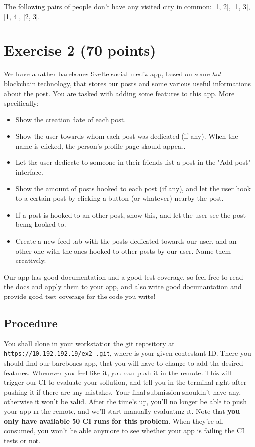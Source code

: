 \documentclass{article}
\begin{document}
The following pairs of people don't have any visited city in common: [1, 2], [1, 3], [1, 4], [2, 3].

\pagebreak
\section*{Exercise 2 (70 points)}
We have a rather barebones Svelte social media app, based on some \textit{hot} blockchain technology, that stores our posts and some various useful informations about the post.
You are tasked with adding some features to this app. More specifically:
\begin{itemize}
	\item Show the creation date of each post.
	\item Show the user towards whom each post was dedicated (if any). When the name is clicked, the person's profile page should appear.
	\item Let the user dedicate to someone in their friends list a post in the "Add post" interface.
	\item Show the amount of posts hooked to each post (if any), and let the user hook to a certain post by clicking a button (or whatever) nearby the post.
	\item If a post is hooked to an other post, show this, and let the user see the post being hooked to.
	\item Create a new feed tab with the posts dedicated towards our user, and an other one with the ones hooked to other posts by our user. Name them creatively.
\end{itemize}

Our app has good documentation and a good test coverage, so feel free to read the docs and apply them to your app, and also write good documantation and provide good test coverage for the code you write!
\subsection*{Procedure}
You shall clone in your workstation the git repository at \verb|https://10.192.192.19/ex2_|\verb|.git|, where  is your given contestant ID.
There you should find our barebones app, that you will have to change to add the desired features.
Whenever you feel like it, you can push it in the remote.
This will trigger our CI to evaluate your sollution, and tell you in the terminal right after pushing it if there are any mistakes.
Your final submission shouldn't have any, otherwise it won't be valid.
After the time's up, you'll no longer be able to push your app in the remote, and we'll start manually evaluating it.
Note that \textbf{you only have available 50 CI runs for this problem}.
When they're all consumed, you won't be able anymore to see whether your app is failing the CI tests or not.
\end{document}
